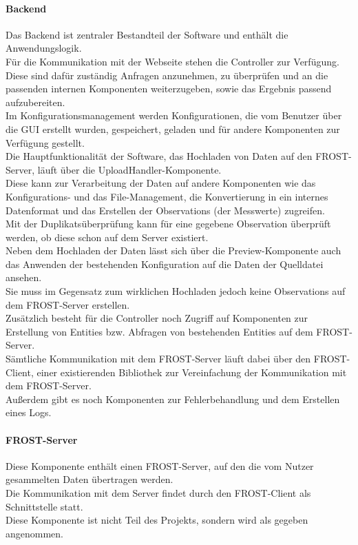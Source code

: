 \paragraph{Backend}
Das Backend ist zentraler Bestandteil der Software und enthält die Anwendungslogik.\\
Für die Kommunikation mit der Webseite stehen die Controller zur Verfügung.\\
Diese sind dafür zuständig Anfragen anzunehmen, zu überprüfen und an die passenden internen Komponenten weiterzugeben, sowie das Ergebnis passend aufzubereiten.\\

\noindent Im Konfigurationsmanagement werden Konfigurationen, die vom Benutzer über die GUI erstellt wurden, gespeichert, geladen und für andere Komponenten zur Verfügung gestellt.\\

\noindent Die Hauptfunktionalität der Software, das Hochladen von Daten auf den FROST-Server, läuft über die UploadHandler-Komponente.\\
Diese kann zur Verarbeitung der Daten auf andere Komponenten wie das Konfigurations- und das File-Management, die Konvertierung in ein internes Datenformat und das Erstellen der Observations (der Messwerte) zugreifen.\\
Mit der Duplikatsüberprüfung kann für eine gegebene Observation überprüft werden, ob diese schon auf dem Server existiert.\\
Neben dem Hochladen der Daten lässt sich über die Preview-Komponente auch das Anwenden der bestehenden Konfiguration auf die Daten der Quelldatei ansehen.\\
Sie muss im Gegensatz zum wirklichen Hochladen jedoch keine Observations auf dem FROST-Server erstellen.\\

\noindent Zusätzlich besteht für die Controller noch Zugriff auf Komponenten zur Erstellung von Entities bzw. Abfragen von bestehenden Entities auf dem FROST-Server.\\
Sämtliche Kommunikation mit dem FROST-Server läuft dabei über den FROST-Client, einer existierenden Bibliothek zur Vereinfachung der Kommunikation mit dem FROST-Server.\\
Außerdem gibt es noch Komponenten zur Fehlerbehandlung und dem Erstellen eines Logs.

\paragraph{FROST-Server}
Diese Komponente enthält einen FROST-Server, auf den die vom Nutzer gesammelten Daten übertragen werden.\\
Die Kommunikation mit dem Server findet durch den FROST-Client als Schnittstelle statt.\\
Diese Komponente ist nicht Teil des Projekts, sondern wird als gegeben angenommen.

